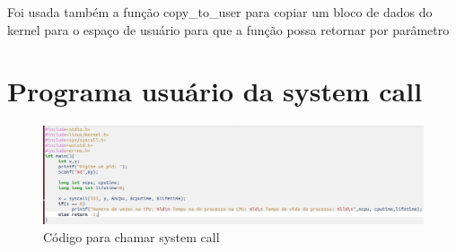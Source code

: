 \documentclass[12pt]{article}
\begin{document}
	Foi usada também a função copy\_to\_user para copiar um bloco de dados do kernel para o espaço de usuário para que a função possa retornar por parâmetro
 \pagebreak
\section{Programa usuário da system call}
\begin{figure}[!htb]
\includegraphics[scale=0.37]{imagens/cod.png} 
	\caption{Código para chamar system call}
\end{figure}
 \pagebreak



\end{document}
